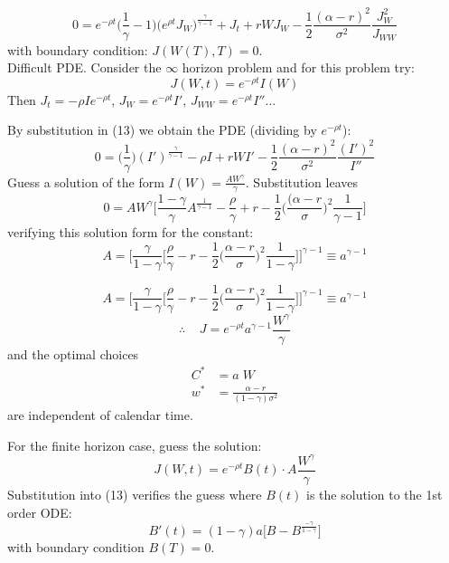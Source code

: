 \documentclass[
14pt,notheorems,hyperref={pdfauthor=whatever}
]{beamer}
\begin{document}
\begin{frame}
\begin{equation} \tag{13}
    0 = e^{-\rho t} \bigg(\frac{1}{\gamma}-1\bigg)\bigg(e^{\rho t}J_W\bigg)^{\frac{\gamma}{\gamma-1}} + J_t + rWJ_W-\frac{1}{2}\frac{(\alpha-r)^2}{\sigma^2}\frac{J_W^2}{J_{WW}}
\end{equation}
with boundary condition: $J(W(T),T)=0$.\\
\hfill\break
Difficult PDE. Consider the $\infty$ horizon problem and for this problem try:\\
\[ J(W,t) = e^{-\rho t}I(W)\]
Then $J_t = -\rho I e^{-\rho t}$, $J_W = e^{-\rho t} I'$, $J_{WW} = e^{-\rho t} I''$...
\end{frame}

\begin{frame}
By substitution in (13) we obtain the PDE (dividing by $e^{-\rho t}$):
\[ 0 = \bigg(\frac{1}{\gamma}\bigg)(I')^{\frac{\gamma}{\gamma-1}} - \rho I + rW I' - \frac{1}{2}\frac{(\alpha-r)^2}{\sigma^2}\frac{(I')^2}{I''}\]
Guess a solution of the form $I(W) = \frac{AW^\gamma}{\gamma}$. Substitution leaves\\
\[ 0 = AW^\gamma \bigg[ \frac{1-\gamma}{\gamma}A^{\frac{1}{\gamma-1}} - \frac{\rho}{\gamma}+r-\frac{1}{2}\bigg(\frac{(\alpha-r}{\sigma}\bigg)^2\frac{1}{\gamma-1}\bigg]\]
verifying this solution form for the constant:\\
\[ A = \Bigg[ \frac{\gamma}{1-\gamma} \bigg[ \frac{\rho}{\gamma} -r - \frac{1}{2}\bigg(\frac{\alpha-r}{\sigma}\bigg)^2\frac{1}{1-\gamma}\bigg]\Bigg]^{\gamma-1} \equiv a^{\gamma-1} \]
\end{frame}

\begin{frame}
\[ A = \Bigg[ \frac{\gamma}{1-\gamma} \bigg[ \frac{\rho}{\gamma} -r - \frac{1}{2}\bigg(\frac{\alpha-r}{\sigma}\bigg)^2\frac{1}{1-\gamma}\bigg]\Bigg]^{\gamma-1} \equiv a^{\gamma-1} \]
\[ \therefore \;\;\;\; J = e^{-\rho t} a^{\gamma-1} \frac{W^\gamma}{\gamma}\]
and the optimal choices
\begin{align*}
    C^* &= a\;W\\
    w^* &= \frac{\alpha-r}{(1-\gamma)\sigma^2}
\end{align*}
are independent of calendar time.
\end{frame}

\begin{frame}
For the finite horizon case, guess the solution:\\
\[ J(W,t) = e^{-\rho t} B(t) \cdot A \frac{W^\gamma}{\gamma}\]
Substitution into (13) verifies the guess where $B(t)$ is the solution to the 1st order ODE:\\
\[ B'(t) = (1-\gamma)a \bigg[ B-B^{\frac{-\gamma}{1-\gamma}}\bigg]\]
with boundary condition $B(T)=0$.\\
\end{frame}
\end{document}
